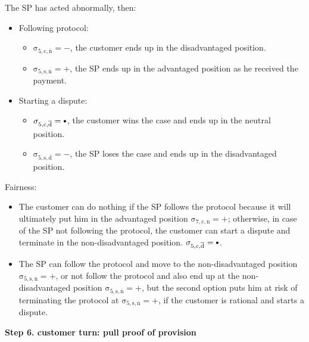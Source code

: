 \documentclass{ieeeaccess}
\newcommand\sbullet[1][.75]{\mathbin{\ThisStyle{\vcenter{\hbox{%
  \scalebox{#1}{$\SavedStyle\bullet$}}}}}%
}
\begin{document}
The SP has acted abnormally, then:

\begin{itemize}
\item
  Following protocol:

  \begin{itemize}
  
  \item
    \(\operatorname{\sigma_{5, c, \overline{n}} = -}\), the customer ends up in the disadvantaged position.
  \item
    \(\operatorname{\sigma_{5, s, \overline{n}} = +}\), the SP ends up in the advantaged position as he received the payment.
  \end{itemize}
\item
  Starting a dispute:

  \begin{itemize}
  
  \item
    \(\operatorname{\sigma_{5, c, \overline{d}} = \sbullet}\), the customer wins the case and ends up in the neutral position. 
  \item
    \(\operatorname{\sigma_{5, s, \overline{d}} = -}\), the SP loses the case and ends up in the disadvantaged position. 
  \end{itemize}
\end{itemize}

Fairness:

\begin{itemize}

\item
  The customer can do nothing if the SP follows the protocol because it will ultimately put him in the advantaged position \(\operatorname{\sigma_{7, c, n} = +}\); otherwise, in case of the SP not following the protocol, the customer can start a dispute and terminate in the non-disadvantaged position.
  \(\operatorname{\sigma_{5, c, \overline{d}} = \sbullet}\).
\item
  The SP can follow the protocol and move to the non-disadvantaged position \(\operatorname{\sigma_{5, s, n} = +}\), or not follow the protocol and also end up at the non-disadvantaged position \(\operatorname{\sigma_{5, s, \overline{n}} = +}\), but the second option puts him at risk of terminating the protocol at \(\operatorname{\sigma_{5, s, \overline{n}} = +}\), if the customer is rational and starts a dispute.
\end{itemize}


\noindent \textbf
{Step 6. customer turn: pull proof of provision}\label{step-6-pull-proof-of-provision}
\end{document}
